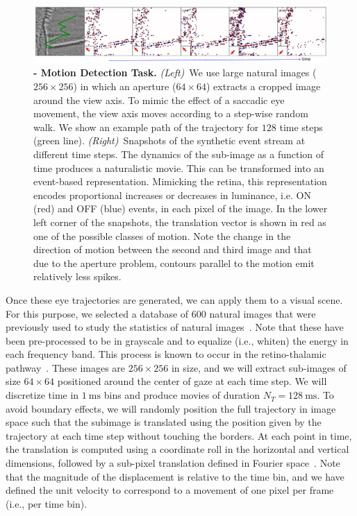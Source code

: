 \documentclass[default]{sn-jnl}%
\theoremstyle{thmstyleone}%
\theoremstyle{thmstyletwo}%
\theoremstyle{thmstylethree}%
\newcommand{\ms}{\si{\milli\second}}%
\begin{document}
\begin{figure}%
    \centering
    \includegraphics[width=0.95\linewidth]{figures/motion_task.pdf}
    \caption{
        {\bf - Motion Detection Task.} \textit{(Left)}~We use large natural images ($256\times256$) in which an aperture ($64\times64$) extracts a cropped image around the view axis. To mimic the effect of a saccadic eye movement, the view axis moves according to a step-wise random walk. We show an example path of the trajectory for $128$ time steps (green line). \textit{(Right)}~Snapshots of the synthetic event stream at different time steps. The dynamics of the sub-image as a function of time produces a naturalistic movie. This can be transformed into an event-based representation. Mimicking the retina, this representation encodes proportional increases or decreases in luminance, i.e. ON (red) and OFF (blue) events, in each pixel of the image. In the lower left corner of the snapshots, the translation vector is shown in red as one of the possible classes of motion. Note the change in the direction of motion between the second and third image and that due to the aperture problem, contours parallel to the motion emit relatively less spikes.}
    \label{fig:motion_task}
\end{figure}
Once these eye trajectories are generated, we can apply them to a visual scene.  
For this purpose, we selected a database of $600$ natural images that were previously used to study the statistics of natural images~\citep{perrinet_edge_2015}. Note that these have been pre-processed to be in grayscale and to equalize (i.e., whiten) the energy in each frequency band. This process is known to occur in the retino-thalamic pathway~\citep{dan_efficient_1996}. These images are $256 \times 256$ in size, and we will extract sub-images of size $64 \times 64$ positioned around the center of gaze at each time step. We will discretize time in $1~\ms$ bins and produce movies of duration $N_T = 128~\ms$. To avoid boundary effects, we will randomly position the full trajectory in image space such that the subimage is translated using the position given by the trajectory at each time step without touching the borders. At each point in time, the translation is computed using a coordinate roll in the horizontal and vertical dimensions, followed by a sub-pixel translation defined in Fourier space~\citep{perrinet_sparse_2015}. Note that the magnitude of the displacement is relative to the time bin, and we have defined the unit velocity to correspond to a movement of one pixel per frame (i.e., per time bin).
\end{document}
